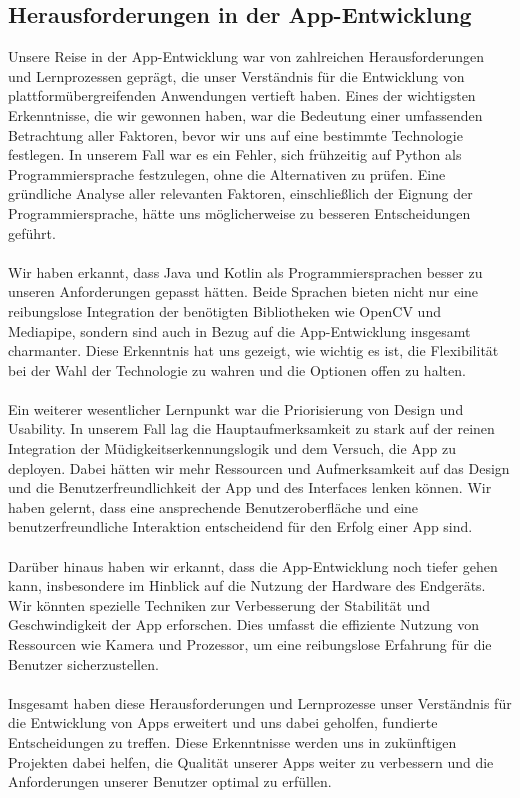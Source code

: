 \subsection{Herausforderungen in der App-Entwicklung}
	\label{ssec:llentwicklung}
	
	Unsere Reise in der App-Entwicklung war von zahlreichen Herausforderungen und Lernprozessen geprägt, die unser Verständnis für die Entwicklung von plattformübergreifenden Anwendungen vertieft haben. Eines der wichtigsten Erkenntnisse, die wir gewonnen haben, war die Bedeutung einer umfassenden Betrachtung aller Faktoren, bevor wir uns auf eine bestimmte Technologie festlegen. In unserem Fall war es ein Fehler, sich frühzeitig auf Python als Programmiersprache festzulegen, ohne die Alternativen zu prüfen. Eine gründliche Analyse aller relevanten Faktoren, einschließlich der Eignung der Programmiersprache, hätte uns möglicherweise zu besseren Entscheidungen geführt.
	\\\\
	Wir haben erkannt, dass Java und Kotlin als Programmiersprachen besser zu unseren Anforderungen gepasst hätten. Beide Sprachen bieten nicht nur eine reibungslose Integration der benötigten Bibliotheken wie OpenCV und Mediapipe, sondern sind auch in Bezug auf die App-Entwicklung insgesamt charmanter. Diese Erkenntnis hat uns gezeigt, wie wichtig es ist, die Flexibilität bei der Wahl der Technologie zu wahren und die Optionen offen zu halten.
	\\\\
	Ein weiterer wesentlicher Lernpunkt war die Priorisierung von Design und Usability. In unserem Fall lag die Hauptaufmerksamkeit zu stark auf der reinen Integration der Müdigkeitserkennungslogik und dem Versuch, die App zu deployen. Dabei hätten wir mehr Ressourcen und Aufmerksamkeit auf das Design und die Benutzerfreundlichkeit der App und des Interfaces lenken können. Wir haben gelernt, dass eine ansprechende Benutzeroberfläche und eine benutzerfreundliche Interaktion entscheidend für den Erfolg einer App sind.
	\\\\
	Darüber hinaus haben wir erkannt, dass die App-Entwicklung noch tiefer gehen kann, insbesondere im Hinblick auf die Nutzung der Hardware des Endgeräts. Wir könnten spezielle Techniken zur Verbesserung der Stabilität und Geschwindigkeit der App erforschen. Dies umfasst die effiziente Nutzung von Ressourcen wie Kamera und Prozessor, um eine reibungslose Erfahrung für die Benutzer sicherzustellen.
	\\\\
	Insgesamt haben diese Herausforderungen und Lernprozesse unser Verständnis für die Entwicklung von Apps erweitert und uns dabei geholfen, fundierte Entscheidungen zu treffen. Diese Erkenntnisse werden uns in zukünftigen Projekten dabei helfen, die Qualität unserer Apps weiter zu verbessern und die Anforderungen unserer Benutzer optimal zu erfüllen.
	
